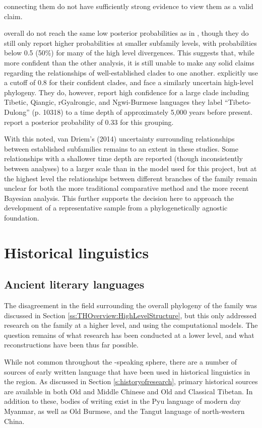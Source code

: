 connecting them do not have sufficiently strong evidence to view them as a valid claim.

 overall do not reach the same low posterior probabilities as in , though they do still only report higher probabilities at smaller subfamily levels, with probabilities below 0.5 (50\%) for many of the high level divergences. This suggests that, while more confident than the other analysis, it is still unable to make any solid claims regarding the relationships of well-established clades to one another.  explicitly use a cutoff of 0.8 for their confident clades, and face a similarly uncertain high-level phylogeny. They do, however, report high confidence for a large clade including Tibetic, Qiangic, rGyalrongic, and Ngwi-Burmese languages they label ``Tibeto-Dulong'' (p. 10318) to a time depth of approximately 5,000 years before present.  report a posterior probability of 0.33 for this grouping.

With this noted, van Driem's (2014) uncertainty surrounding relationships between established subfamilies remains to an extent in these studies. Some relationships with a shallower time depth are reported (though inconsistently between analyses) to a larger scale than in the model used for this project, but at the highest level the relationships between different branches of the family remain unclear for both the more traditional comparative method and the more recent Bayesian analysis. This further supports the decision here to approach the development of a representative sample from a phylogenetically agnostic foundation.


\section{Historical linguistics}
\subsection{Ancient literary languages}\label{s:AncientLiteraryLanguages}
The disagreement in the field surrounding the overall phylogeny of the family was discussed in Section \ref{ss:THOverview:HighLevelStructure}, but this only addressed research on the family at a higher level, and using the computational models. The question remains of what research has been conducted at a lower level, and what reconstructions have been thus far possible.

While not common throughout the \lfam-speaking sphere, there are a number of sources of early written language that have been used in historical linguistics in the region. As discussed in Section \ref{s:historyofresearch}, primary historical sources are available in both Old and Middle Chinese and Old and Classical Tibetan. In addition to these, bodies of writing exist in the Pyu language of modern day Myanmar, as well as Old Burmese, and the Tangut language of north-western China.

